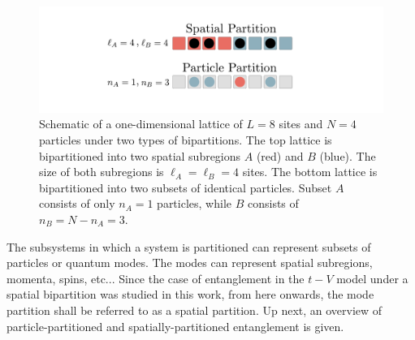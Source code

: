 \begin{figure}[h]
\begin{center}
\includegraphics[width=1.0\textwidth]{spatialParticle.pdf}
\end{center}
\caption{Schematic of a one-dimensional lattice of $L=8$ sites and $N=4$ particles under two types of bipartitions. The top lattice is bipartitioned into two spatial subregions $A$ (red) and $B$ (blue). The size of both subregions is $\ell_A = \ell_B = 4$ sites. The bottom lattice is bipartitioned into two subsets of identical particles. Subset $A$ consists of only $n_A=1$ particles, while $B$ consists of $n_B = N - n_A = 3$.}
\label{fig:spatialParticle}
\end{figure}

	
	The subsystems in which a system is partitioned can represent subsets of particles or quantum modes. The modes can represent spatial subregions, momenta, spins, etc... Since the case of entanglement in the $t-V$ model under a spatial bipartition was studied in this work, from here onwards, the mode partition shall be referred to as a spatial partition. Up next, an overview of particle-partitioned and spatially-partitioned entanglement is given.

